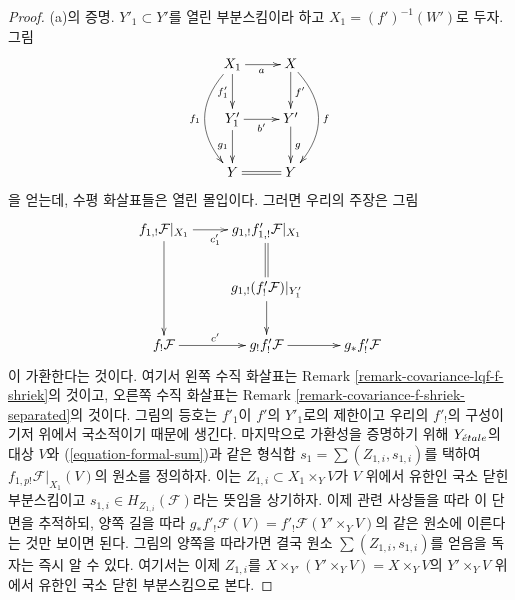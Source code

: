 \begin{proof}
\medskip\noindent
(a)의 증명. $Y'_1 \subset Y'$를 열린 부분스킴이라 하고
$X_1 = (f')^{-1}(W')$로 두자. 그림
$$
\xymatrix{
X_1 \ar[d]_{f'_1} \ar[r]_a \ar@/_2em/[dd]_{f_1} &
X \ar[d]^{f'} \ar@/^2em/[dd]^f \\
Y'_1 \ar[d]_{g_1} \ar[r]_{b'} &
Y' \ar[d]^g \\
Y \ar@{=}[r] &
Y
}
$$
을 얻는데, 수평 화살표들은 열린 몰입이다. 그러면 우리의 주장은 그림
$$
\xymatrix{
f_{1, !}\mathcal{F}|_{X_1} \ar[r]_{c'_1} \ar[dd] &
g_{1, !}f'_{1, !}\mathcal{F}|_{X_1} \ar@{=}[d] \\
& g_{1, !}(f'_!\mathcal{F})|_{Y'_1} \ar[d] \\
f_!\mathcal{F} \ar[r]^{c'} &
g_!f'_!\mathcal{F} \ar[r] & g_*f'_!\mathcal{F}
}
$$
이 가환한다는 것이다. 여기서 왼쪽 수직 화살표는 Remark
\ref{remark-covariance-lqf-f-shriek}의 것이고, 오른쪽 수직 화살표는
Remark \ref{remark-covariance-f-shriek-separated}의 것이다.
그림의 등호는 $f'_1$이 $f'$의 $Y'_1$로의 제한이고 우리의
$f'_!$의 구성이 기저 위에서 국소적이기 때문에 생긴다.
마지막으로 가환성을 증명하기 위해 $Y_{\acute{e}tale}$의 대상 $V$와
(\ref{equation-formal-sum})과 같은 형식합
$s_1 = \sum (Z_{1, i}, s_{1, i})$를 택하여
$f_{1, p!}\mathcal{F}|_{X_1}(V)$의 원소를 정의하자. 이는
$Z_{1, i} \subset X_1 \times_Y V$가 $V$ 위에서 유한인 국소 닫힌
부분스킴이고 $s_{1, i} \in H_{Z_{1, i}}(\mathcal{F})$라는 뜻임을
상기하자. 이제 관련 사상들을 따라 이 단면을 추적하되, 양쪽 길을
따라 $g_*f'_!\mathcal{F}(V) = f'_!\mathcal{F}(Y' \times_Y V)$의
같은 원소에 이른다는 것만 보이면 된다. 그림의 양쪽을 따라가면
결국 원소 $\sum (Z_{1, i}, s_{1, i})$를 얻음을 독자는 즉시 알 수 있다.
여기서는 이제 $Z_{1, i}$를
$X \times_{Y'} (Y' \times_Y V) = X \times_Y V$의
$Y' \times_Y V$ 위에서 유한인 국소 닫힌 부분스킴으로 본다.


\end{proof}
